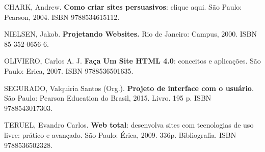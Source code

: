 \begin{pud}
	\begin{bibcomplementar}
	
 		\item CHARK, Andrew. \textbf{Como criar sites persuasivos}: clique aqui. São Paulo: Pearson, 2004. ISBN 9788534615112.
        \item NIELSEN, Jakob. \textbf{Projetando Websites.} Rio de Janeiro: Campus, 2000. ISBN 85-352-0656-6.
        \item OLIVIERO, Carlos A. J. \textbf{Faça Um Site HTML 4.0}: conceitos e aplicações. São Paulo: Erica, 2007. ISBN 9788536501635.
        \item SEGURADO, Valquiria Santos (Org.). \textbf{Projeto de interface com o usuário}. São Paulo: Pearson Education do Brasil, 2015. Livro. 195 p. ISBN 9788543017303.
        \item TERUEL, Evandro Carlos. \textbf{Web total}: desenvolva sites com tecnologias de uso livre: prático e avançado. São Paulo: Érica, 2009. 336p. Bibliografia. ISBN 9788536502328.	

	\end{bibcomplementar}
	
\end{pud}




